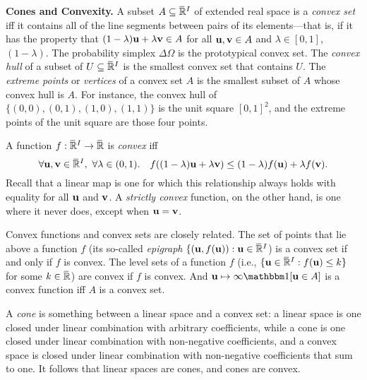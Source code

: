 \textbf{Cones and Convexity.}
A subset $A \subseteq \mskip1mu\overline{\mskip-1mu\mathbb R\!}\,^I$ of extended real space is a \emph{convex set} iff
it contains all of the line segments between pairs of its elements---that is, if
it has the property that
$
(1-\lambda) \mathbf u + \lambda \mathbf v \in A
$
for all $\mathbf u, \mathbf v \in A$ and $\lambda \in [0,1]$,
$(1-\lambda)$.
The probability simplex $\Delta \Omega$ is the prototypical convex set. 
The \emph{convex hull} of a subset of $U \subseteq \mskip1mu\overline{\mskip-1mu\mathbb R\!}\,^I$ is the smallest convex set that contains $U$. 
The \emph{extreme points} or \emph{vertices} of a convex set $A$ is the smallest subset 
of $A$ whose convex hull is $A$. 
For instance, the convex hull of $\{ (0,0), (0,1), (1,0), (1,1) \}$
is the unit square $[0,1]^2$, and the extreme points of the unit square are those four points. 

%
A function $f : \mskip1mu\overline{\mskip-1mu\mathbb R\!}\,^I \to \mskip1mu\overline{\mskip-1mu\mathbb R\!}\,$ is \emph{convex} iff
\[
    \forall \mathbf u, \mathbf v \in \mskip1mu\overline{\mskip-1mu\mathbb R\!}\,^I,~\forall \lambda \in (0,1).\quad
    f( (1-\lambda) \mathbf u + \lambda \mathbf v ) \le (1-\lambda) f(\mathbf u) + \lambda f(\mathbf v).
\]
Recall that a linear map is one for which this relationship always holds with equality for all $\mathbf u$ and $\mathbf v$. 
A \emph{strictly convex} function, on the other hand, is one where it never does, except when $\mathbf u = \mathbf v$. 

Convex functions and convex sets are closely related. The set of points that lie above a function $f$
 (its so-called \emph{epigraph} $\{ (\mathbf u, f(\mathbf u)) : \mathbf u \in \mskip1mu\overline{\mskip-1mu\mathbb R\!}\,^I$) 
is a convex set if and only if $f$ is convex. The level sets of a function $f$ (i.e., $\{ \mathbf u \in \mskip1mu\overline{\mskip-1mu\mathbb R\!}\,^I : f(\mathbf u) \le k \}$ for some $k \in \mskip1mu\overline{\mskip-1mu\mathbb R\!}\,$) are convex if $f$ is convex. And $\mat u \mapsto \infty \mathbbm 1[\mat u \in A]$ is a convex function iff $A$ is a convex set. 

A \emph{cone} is something between a linear space and a convex set: a linear space is one closed under linear combination with arbitrary coefficients, while a cone is one closed under linear combination with non-negative coefficients, and a convex space is closed under linear combination with non-negative coefficients that sum to one.
It follows that linear spaces are cones, and cones are convex.



